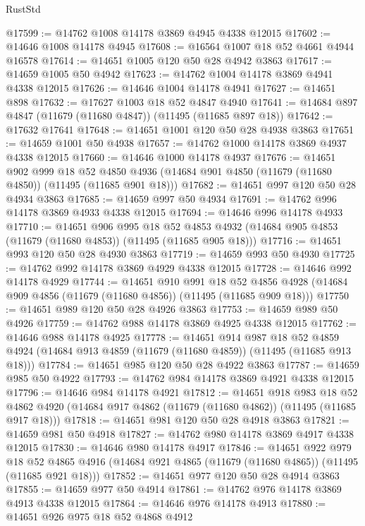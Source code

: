 \begin{lexlean}{RustStd}
\begin{coremodule}
@17599 := @14762 @1008 @14178 @3869 @4945 @4338 @12015
@17602 := @14646 @1008 @14178 @4945
@17608 := @16564 @1007 @18 @52 @4661 @4944 @16578
@17614 := @14651 @1005 @120 @50 @28 @4942 @3863
@17617 := @14659 @1005 @50 @4942
@17623 := @14762 @1004 @14178 @3869 @4941 @4338 @12015
@17626 := @14646 @1004 @14178 @4941
@17627 := @14651 @898
@17632 := @17627 @1003 @18 @52 @4847 @4940
@17641 := @14684 @897 @4847 (@11679 (@11680 @4847)) (@11495 (@11685 @897 @18))
@17642 := @17632 @17641
@17648 := @14651 @1001 @120 @50 @28 @4938 @3863
@17651 := @14659 @1001 @50 @4938
@17657 := @14762 @1000 @14178 @3869 @4937 @4338 @12015
@17660 := @14646 @1000 @14178 @4937
@17676 := @14651
    @902
    @999
    @18
    @52
    @4850
    @4936
    (@14684 @901 @4850 (@11679 (@11680 @4850)) (@11495 (@11685 @901 @18)))
@17682 := @14651 @997 @120 @50 @28 @4934 @3863
@17685 := @14659 @997 @50 @4934
@17691 := @14762 @996 @14178 @3869 @4933 @4338 @12015
@17694 := @14646 @996 @14178 @4933
@17710 := @14651
    @906
    @995
    @18
    @52
    @4853
    @4932
    (@14684 @905 @4853 (@11679 (@11680 @4853)) (@11495 (@11685 @905 @18)))
@17716 := @14651 @993 @120 @50 @28 @4930 @3863
@17719 := @14659 @993 @50 @4930
@17725 := @14762 @992 @14178 @3869 @4929 @4338 @12015
@17728 := @14646 @992 @14178 @4929
@17744 := @14651
    @910
    @991
    @18
    @52
    @4856
    @4928
    (@14684 @909 @4856 (@11679 (@11680 @4856)) (@11495 (@11685 @909 @18)))
@17750 := @14651 @989 @120 @50 @28 @4926 @3863
@17753 := @14659 @989 @50 @4926
@17759 := @14762 @988 @14178 @3869 @4925 @4338 @12015
@17762 := @14646 @988 @14178 @4925
@17778 := @14651
    @914
    @987
    @18
    @52
    @4859
    @4924
    (@14684 @913 @4859 (@11679 (@11680 @4859)) (@11495 (@11685 @913 @18)))
@17784 := @14651 @985 @120 @50 @28 @4922 @3863
@17787 := @14659 @985 @50 @4922
@17793 := @14762 @984 @14178 @3869 @4921 @4338 @12015
@17796 := @14646 @984 @14178 @4921
@17812 := @14651
    @918
    @983
    @18
    @52
    @4862
    @4920
    (@14684 @917 @4862 (@11679 (@11680 @4862)) (@11495 (@11685 @917 @18)))
@17818 := @14651 @981 @120 @50 @28 @4918 @3863
@17821 := @14659 @981 @50 @4918
@17827 := @14762 @980 @14178 @3869 @4917 @4338 @12015
@17830 := @14646 @980 @14178 @4917
@17846 := @14651
    @922
    @979
    @18
    @52
    @4865
    @4916
    (@14684 @921 @4865 (@11679 (@11680 @4865)) (@11495 (@11685 @921 @18)))
@17852 := @14651 @977 @120 @50 @28 @4914 @3863
@17855 := @14659 @977 @50 @4914
@17861 := @14762 @976 @14178 @3869 @4913 @4338 @12015
@17864 := @14646 @976 @14178 @4913
@17880 := @14651
    @926
    @975
    @18
    @52
    @4868
    @4912

\end{coremodule}
\end{lexlean}
